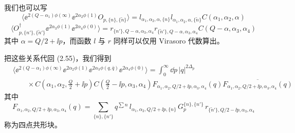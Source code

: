 我们也可以写
\begin{equation}
  \langle \ee^{2(Q-\alpha_1)\phi(\infty)}\ee^{2\alpha_2\phi(1)}O_{p,\{n\},\{\tilde n\}}\rangle
  = l_{\alpha_1,\alpha_2,\alpha,\{n\}}l_{\alpha_1,\alpha_2,\alpha,\{\tilde n\}}
  C(\alpha_1,\alpha_2,\alpha)
  \tag{2.57}
\end{equation}
\begin{equation}
  \langle O_{p,\{n'\},\{\tilde n'\}}^{\dagger}\ee^{2\alpha_3\phi(1)}
  \ee^{2\alpha_4\phi(0)}\rangle
  = r_{\{n'\},Q-\alpha,\alpha_3,\alpha_4}r_{\{\tilde n'\},Q-\alpha,\alpha_3,\alpha_4}
  C(Q-\alpha,\alpha_3,\alpha_4)
  \tag{2.58}
\end{equation}
其中 $\alpha=Q/2+\ii p$，而函数 $l$ 与 $r$ 同样可以仅用 Virasoro 代数算出。


把这些关系代回 (2.55)，我们得到
\begin{equation}
  \begin{aligned}
    &\langle \ee^{2(Q-\alpha_1)\phi(\infty)}\ee^{2\alpha_2\phi(1)}
      \ee^{2\alpha_3\phi(q,\bar q)}\ee^{2\alpha_4\phi(0)}\rangle
      = \int_0^\infty \dd p\,|q|^{2\Delta_p} \\
    &\qquad \times C\!\left(\alpha_1,\alpha_2,\frac{Q}{2}+\ii p\right)
      C\!\left(\frac{Q}{2}-\ii p,\alpha_3,\alpha_4\right)
      F_{\alpha_1,\alpha_2,Q/2+\ii p,\alpha_3,\alpha_4}(q)
      \overline{F_{\alpha_1,\alpha_2,Q/2+\ii p,\alpha_3,\alpha_4}(q)}
  \end{aligned}
  \tag{2.59}
\end{equation}
其中
\begin{equation}
  F_{\alpha_1,\alpha_2,Q/2+\ii p,\alpha_3,\alpha_4}(q)
  = \sum_{\{n\},\{n'\}} q^{\sum n}\,
  l_{\alpha_1,\alpha_2,Q/2+\ii p,\{n\}}\,
  G^{\{n\},\{n'\}}_p\,
  r_{\{\tilde n'\},Q/2-\ii p,\alpha_3,\alpha_4}
  \tag{2.60}
\end{equation}
称为四点共形块。


